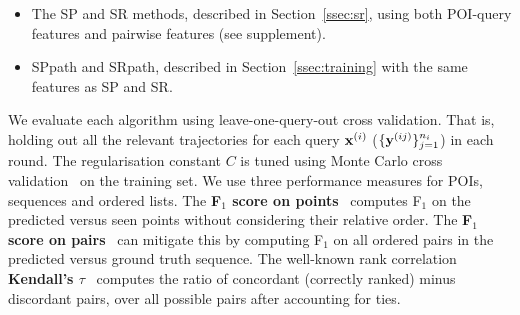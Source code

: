 \begin{itemize}[leftmargin=0.125in]
\item The SP and SR methods, described in Section~\ref{ssec:sr}, using both POI-query features and pairwise features (see supplement).

\item {\sc SPpath} and {\sc SRpath}, described in Section~\ref{ssec:training} with the same features as SP and SR.
\end{itemize}%



We evaluate each algorithm using leave-one-query-out cross validation.
That is, holding out all the relevant trajectories for each query $\mathbf{x}^{({i})}$ (\ie $\{\mathbf{y}^{({ij})}\}_{j=1}^{n_i}$) in each round.
The regularisation constant $C$ is tuned using Monte Carlo cross validation~\cite{burman1989comparative} on the training set.
We use three performance measures for POIs, sequences and ordered lists.
The {\bf F$_1$ score on points}~\cite{ijcai15} computes F$_1$ on the predicted versus seen points
without considering their relative order.
The {\bf F$_1$ score on pairs}~\cite{cikm16paper} %
can mitigate this by computing F$_1$ on all ordered pairs in the predicted versus ground truth sequence. %
The well-known rank correlation {\bf Kendall's $\tau$}~\cite{agresti2010analysis}
computes the ratio of concordant (correctly ranked) %
minus discordant pairs, over all possible pairs after accounting for ties.%


